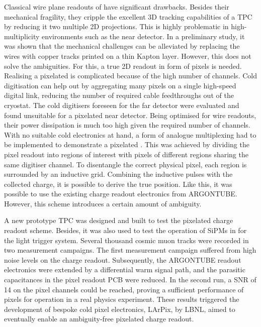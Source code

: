 Classical wire plane readouts of \lartpc{} have significant drawbacks.
Besides their mechanical fragility, they cripple the excellent 3D tracking capabilities of a TPC by reducing it two multiple 2D projections.
This is highly problematic in high-multiplicity environments such as the \dune{} near detector.
In a preliminary study, it was shown that the mechanical challenges can be alleviated by replacing the wires with copper tracks printed on a thin Kapton layer.
However, this does not solve the ambiguities.
For this, a true 2D readout in form of pixels is needed.
Realising a pixelated \lartpc{} is complicated because of the high number of channels.
Cold digitisation can help out by aggregating many pixels on a single high-speed digital link, reducing the number of required cable feedthroughs out of the cryostat.
The cold digitisers foreseen for the \dune{} far detector were evaluated and found unsuitable for a pixelated near detector.
Being optimised for wire readouts, their power dissipation is much too high given the required number of channels.
With no suitable cold electronics at hand, a form of analogue multiplexing had to be implemented to demonstrate a pixelated \lartpc{}.
This was achieved by dividing the pixel readout into regions of interest with pixels of different regions sharing the same digitiser channel.
To disentangle the correct physical pixel, each region is surrounded by an inductive grid.
Combining the inductive pulses with the collected charge, it is possible to derive the true position.
Like this, it was possible to use the existing charge readout electronics from ARGONTUBE.
However, this scheme introduces a certain amount of ambiguity.

A new prototype TPC was designed and built to test the pixelated charge readout scheme.
Besides, it was also used to test the operation of SiPMs in \lar{} for the light trigger system.
Several thousand cosmic muon tracks were recorded in two measurement campaigns.
The first measurement campaign suffered from high noise levels on the charge readout.
Subsequently, the ARGONTUBE readout electronics were extended by a differential warm signal path, and the parasitic capacitances in the pixel readout PCB were reduced.
In the second run, a SNR of \num{14} on the pixel channels could be reached, proving a sufficient performance of pixels for operation in a real physics experiment.
These results triggered the development of bespoke cold pixel electronics, LArPix, by LBNL, aimed to eventually enable an ambiguity-free pixelated \lartpc{} charge readout.

